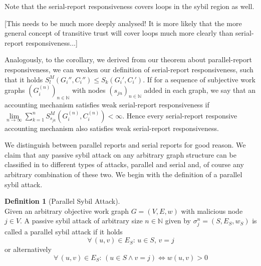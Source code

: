 \documentclass[11pt,a4paper]{article}
\theoremstyle{definition}
\newtheorem{definition}{Definition}[section]
\theoremstyle{theorem}
\theoremstyle{proposition}
\theoremstyle{corollary}
\theoremstyle{lemma}
\theoremstyle{example}
\theoremstyle{remark}
\begin{document}
\noindent{}Note that the serial-report responsiveness covers loops in the sybil region as well. \begin{center} [This needs to be much more deeply analysed! It is more likely that the more general concept of transitive trust will cover loops much more clearly than serial-report responsiveness...] \vspace{1em}\\ \end{center}

\noindent{}Analogously, to the corollary, we derived from our theorem about parallel-report responsiveness, we can weaken our definition of serial-report responsiveness, such that it holds $S^M_l(G_i'',C_i'')\leq{}S_k(G_i',C_i')$. If for a sequence of subjective work graphs $(G_i^{(n)})_{n\in\mathbb{N}}$ with nodes $(s_{jn})_{n\in\mathbb{N}}$ added in each graph, we say that an accounting mechanism satisfies weak serial-report responsiveness if $\lim\limits_{n\rightarrow\infty}\sum\limits_{k=1}^{n}S^M_{s_{jk}}(G_i^{(n)},C_i^{(n)})<\infty$. Hence every serial-report responsive accounting mechanism also satisfies weak serial-report responsiveness. 

\noindent{}We distinguish between parallel reports and serial reports for good reason. We claim that any passive sybil attack on any arbitrary graph structure can be classified in to different types of attacks, parallel and serial and, of course any arbitrary combination of these two. We begin with the definition of a parallel sybil attack.

\begin{definition}[Parallel Sybil Attack]\ \\
Given an arbitrary objective work graph $G=(V,E,w)$ with malicious node $j\in{}V$. A passive sybil attack of arbitrary size $n\in\mathbb{N}$ given by $\sigma^n_j=(S,E_S,w_S)$ is called a parallel sybil attack if it holds 
\[
\forall\,(u,v)\in{}E_S:\,u\in{}S,\,v=j
\]
or alternatively
\[
\forall\,(u,v)\in{}E_S:\,\left(u\in{}S\wedge v=j \right) \Leftrightarrow w(u,v)>0
\]
\end{definition}
\end{document}

